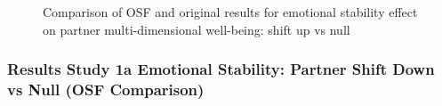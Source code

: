 \documentclass[
  singlecolumn]{article}
\begin{document}
\begin{figure}


\caption{\label{fig-results-emotional-stability-partner-up-comparison}Comparison
of OSF and original results for emotional stability effect on partner
multi-dimensional well-being: shift up vs null}

\end{figure}%

\newpage{}

\subsubsection{Results Study 1a Emotional Stability: Partner Shift Down
vs Null (OSF
Comparison)}\label{results-study-1a-emotional-stability-partner-shift-down-vs-null-osf-comparison}
\end{document}
